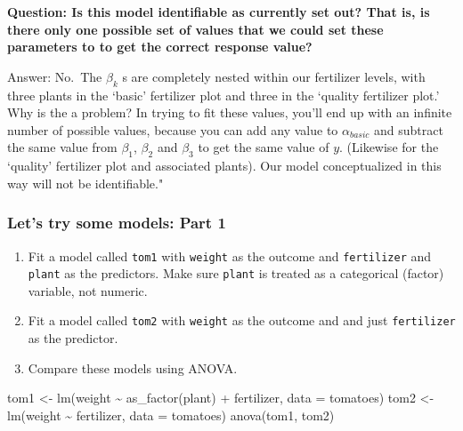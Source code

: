 \documentclass[
  openany]{book}
\newenvironment{Shaded}{\begin{snugshade}}{\end{snugshade}}
\newcommand{\AttributeTok}[1]{\textcolor[rgb]{0.77,0.63,0.00}{#1}}
\newcommand{\FunctionTok}[1]{\textcolor[rgb]{0.00,0.00,0.00}{#1}}
\newcommand{\NormalTok}[1]{#1}
\newcommand{\OtherTok}[1]{\textcolor[rgb]{0.56,0.35,0.01}{#1}}
\newcommand{\SpecialCharTok}[1]{\textcolor[rgb]{0.00,0.00,0.00}{#1}}
\providecommand{\tightlist}{%
  \setlength{\itemsep}{0pt}\setlength{\parskip}{0pt}}
\begin{document}
\textbf{Question: Is this model identifiable as currently set out? That is, is there only one possible set of values that we could set these parameters to to get the correct response value?}

Answer: No.~The \(\beta_k\) s are completely nested within our fertilizer levels, with three plants in the `basic' fertilizer plot and three in the `quality fertilizer plot.' Why is the a problem? In trying to fit these values, you'll end up with an infinite number of possible values, because you can add any value to \(\alpha_{basic}\) and subtract the same value from \(\beta_1\), \(\beta_2\) and \(\beta_3\) to get the same value of \(y\). (Likewise for the `quality' fertilizer plot and associated plants). Our model conceptualized in this way will not be identifiable."

\hypertarget{lets-try-some-models-part-1}{%
\subsubsection{Let's try some models: Part 1}\label{lets-try-some-models-part-1}}

\begin{enumerate}
\def\labelenumi{\arabic{enumi}.}
\tightlist
\item
  Fit a model called \texttt{tom1} with \texttt{weight} as the outcome and \texttt{fertilizer} and \texttt{plant} as the predictors. Make sure \texttt{plant} is treated as a categorical (factor) variable, not numeric.
\item
  Fit a model called \texttt{tom2} with \texttt{weight} as the outcome and and just \texttt{fertilizer} as the predictor.
\item
  Compare these models using ANOVA.
\end{enumerate}

\begin{Shaded}
\begin{Highlighting}[]
\NormalTok{tom1 }\OtherTok{\textless{}{-}} \FunctionTok{lm}\NormalTok{(weight }\SpecialCharTok{\textasciitilde{}} \FunctionTok{as\_factor}\NormalTok{(plant) }\SpecialCharTok{+}\NormalTok{ fertilizer, }\AttributeTok{data =}\NormalTok{ tomatoes)}
\NormalTok{tom2 }\OtherTok{\textless{}{-}} \FunctionTok{lm}\NormalTok{(weight }\SpecialCharTok{\textasciitilde{}}\NormalTok{ fertilizer, }\AttributeTok{data =}\NormalTok{ tomatoes)}
\FunctionTok{anova}\NormalTok{(tom1, tom2)}
\end{Highlighting}
\end{Shaded}
\end{document}

